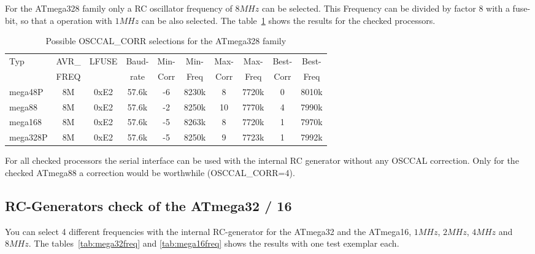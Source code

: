 For the ATmega328 family only a RC oscillator frequency of \(8MHz\) can be selected.
This Frequency can be divided by factor 8 with a fuse-bit, so that a
operation with \(1MHz\) can be also selected.
The table~\ref{tab:mega328freq} shows the results for the checked processors.

\begin{table}[H]
  \begin{center}
    \begin{tabular}{| l | c | c | c || c | c || c | c || c | c |}
    \hline
   Typ  &       AVR\_ & LFUSE & Baud- & Min- & Min- & Max- & Max- & Best- & Best-  \\
        &       FREQ  &       & rate & Corr & Freq & Corr & Freq  & Corr  & Freq  \\
    \hline
    \hline
mega48P &          8M & 0xE2  & 57.6k &  -6  & 8230k &  8  & 7720k  & 0  & 8010k \\
    \hline
mega88 &          8M & 0xE2  & 57.6k &  -2  & 8250k & 10  & 7770k  & 4  & 7990k \\
    \hline
mega168 &          8M & 0xE2  & 57.6k &  -5  & 8263k &  8  & 7720k  & 1  & 7970k \\
    \hline
mega328P &          8M & 0xE2  & 57.6k &  -5  & 8250k &  9  & 7723k  & 1  & 7992k \\
    \hline
    \end{tabular}
  \end{center}
  \caption{Possible OSCCAL\_CORR selections for the ATmega328 family}
  \label{tab:mega328freq}
\end{table}

For all checked processors the serial interface can be used with the internal
RC generator without any OSCCAL correction.
Only for the checked ATmega88 a correction would be worthwhile (OSCCAL\_CORR=4).

\subsection{RC-Generators check of the ATmega32 / 16}

You can select 4 different frequencies with the internal RC-generator for
the ATmega32 and the ATmega16, \(1MHz\), \(2MHz\), \(4MHz\) and \(8MHz\).
The tables~\ref{tab:mega32freq} and \ref{tab:mega16freq} shows the results
with one test exemplar each.

